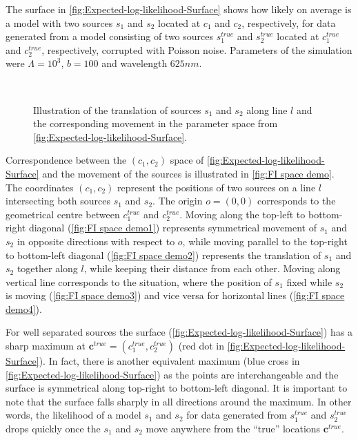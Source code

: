 The surface in \autoref{fig:Expected-log-likelihood-Surface} shows how likely on average is a model with two sources $s_1$ and $s_2$ located at $c_1$ and $c_2$, respectively, for data generated from a model consisting of two sources $s_1^{true}$ and $s_2^{true}$ located at $c_1^{true}$ and $c_2^{true}$, respectively, corrupted with Poisson noise. Parameters of the simulation were $\Lambda=10^3$, $b=100$ and wavelength $625 \unit{nm}$.

\begin{figure}[hb]
	\newcommand{\wf}{.48\textwidth}
	\centering
	 \\
	\caption{Illustration of the translation of sources $s_1$ and $s_2$ along line $l$ and the corresponding movement in the parameter space from \autoref{fig:Expected-log-likelihood-Surface}.}
	\label{fig:FI space demo}
\end{figure}
%
Correspondence between the $(c_1,c_2)$ space of \autoref{fig:Expected-log-likelihood-Surface} and the movement of the sources is illustrated in \autoref{fig:FI space demo}. The coordinates $(c_1,c_2)$ represent the positions of two sources on a line $l$ intersecting both sources $s_1$ and  $s_2$. The origin $o=(0,0)$ corresponds to the geometrical centre between $c_1^{true}$ and $c_2^{true}$. Moving along the top-left to bottom-right diagonal (\autoref{fig:FI space demo1}) represents symmetrical movement of $s_1$ and $s_2$  in opposite directions with respect to $o$, while moving parallel to the top-right to bottom-left diagonal (\autoref{fig:FI space demo2}) represents the translation of $s_1$ and $s_2$ together along $l$, while keeping their distance from each other. Moving along vertical line corresponds to the situation, where the position of $s_1$ fixed while $s_2$ is moving (\autoref{fig:FI space demo3}) and vice versa for horizontal lines (\autoref{fig:FI space demo4}).

For well separated sources the surface (\autoref{fig:Expected-log-likelihood-Surface}\aaa) has a sharp maximum at $\bm{c}^{true}=(c_1^{true},c_2^{true})$ (red dot in \autoref{fig:Expected-log-likelihood-Surface}\aaa). In fact, there is another equivalent maximum (blue cross in \autoref{fig:Expected-log-likelihood-Surface}\aaa) as the points are interchangeable and the surface is symmetrical along top-right to bottom-left diagonal. It is important to note that the surface falls sharply in all directions around the maximum. In other words, the likelihood of a model $s_1$ and $s_2$ for data generated from $s_1^{true}$ and $s_2^{true}$ drops quickly once the $s_1$ and $s_2$ move anywhere from the ``true'' locations $\bm{c}^{true}$.

